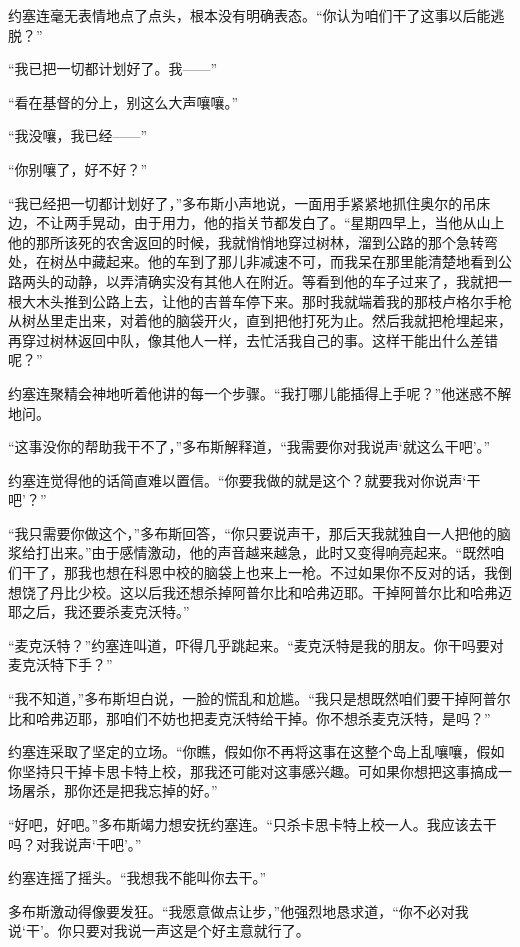     约塞连毫无表情地点了点头，根本没有明确表态。“你认为咱们干了这事以后能逃脱？”

    “我已把一切都计划好了。我——”

    “看在基督的分上，别这么大声嚷嚷。”

    “我没嚷，我已经——”

    “你别嚷了，好不好？”

    “我已经把一切都计划好了，”多布斯小声地说，一面用手紧紧地抓住奥尔的吊床边，不让两手晃动，由于用力，他的指关节都发白了。“星期四早上，当他从山上他的那所该死的农舍返回的时候，我就悄悄地穿过树林，溜到公路的那个急转弯处，在树丛中藏起来。他的车到了那儿非减速不可，而我呆在那里能清楚地看到公路两头的动静，以弄清确实没有其他人在附近。等看到他的车子过来了，我就把一根大木头推到公路上去，让他的吉普车停下来。那时我就端着我的那枝卢格尔手枪从树丛里走出来，对着他的脑袋开火，直到把他打死为止。然后我就把枪埋起来，再穿过树林返回中队，像其他人一样，去忙活我自己的事。这样干能出什么差错呢？”

    约塞连聚精会神地听着他讲的每一个步骤。“我打哪儿能插得上手呢？”他迷惑不解地问。

    “这事没你的帮助我干不了，”多布斯解释道，“我需要你对我说声‘就这么干吧’。”

    约塞连觉得他的话简直难以置信。“你要我做的就是这个？就要我对你说声‘干吧’？”

    “我只需要你做这个，”多布斯回答，“你只要说声干，那后天我就独自一人把他的脑浆给打出来。”由于感情激动，他的声音越来越急，此时又变得响亮起来。“既然咱们干了，那我也想在科恩中校的脑袋上也来上一枪。不过如果你不反对的话，我倒想饶了丹比少校。这以后我还想杀掉阿普尔比和哈弗迈耶。干掉阿普尔比和哈弗迈耶之后，我还要杀麦克沃特。”

    “麦克沃特？”约塞连叫道，吓得几乎跳起来。“麦克沃特是我的朋友。你干吗要对麦克沃特下手？”

    “我不知道，”多布斯坦白说，一脸的慌乱和尬尴。“我只是想既然咱们要干掉阿普尔比和哈弗迈耶，那咱们不妨也把麦克沃特给干掉。你不想杀麦克沃特，是吗？”

    约塞连采取了坚定的立场。“你瞧，假如你不再将这事在这整个岛上乱嚷嚷，假如你坚持只干掉卡思卡特上校，那我还可能对这事感兴趣。可如果你想把这事搞成一场屠杀，那你还是把我忘掉的好。”

    “好吧，好吧。”多布斯竭力想安抚约塞连。“只杀卡思卡特上校一人。我应该去干吗？对我说声‘干吧’。”

    约塞连摇了摇头。“我想我不能叫你去干。”

    多布斯激动得像要发狂。“我愿意做点让步，”他强烈地恳求道，“你不必对我说‘干’。你只要对我说一声这是个好主意就行了。

